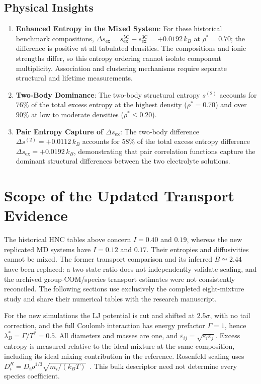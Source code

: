 \documentclass[11pt,a4paper]{article}
\begin{document}
\subsection{Physical Insights}
\begin{enumerate}
    \item \textbf{Enhanced Entropy in the Mixed System}: For these historical benchmark compositions, $\Delta s_{\text{ex}} = s_{\text{ex}}^{\text{5C}} - s_{\text{ex}}^{\text{3C}} = +0.0192 \, k_B$ at $\rho^*=0.70$; the difference is positive at all tabulated densities. The compositions and ionic strengths differ, so this entropy ordering cannot isolate component multiplicity. Association and clustering mechanisms require separate structural and lifetime measurements.
    \item \textbf{Two-Body Dominance}: The two-body structural entropy $s^{(2)}$ accounts for $76\%$ of the total excess entropy at the highest density ($\rho^* = 0.70$) and over $90\%$ at low to moderate densities ($\rho^* \le 0.20$).
    \item \textbf{Pair Entropy Capture of $\Delta s_{\text{ex}}$}: The two-body difference $\Delta s^{(2)} = +0.0112 \, k_B$ accounts for $58\%$ of the total excess entropy difference $\Delta s_{\text{ex}} = +0.0192 \, k_B$, demonstrating that pair correlation functions capture the dominant structural differences between the two electrolyte solutions.
\end{enumerate}


\section{Scope of the Updated Transport Evidence}

The historical HNC tables above concern $I=0.40$ and $0.19$, whereas the new replicated MD systems have $I=0.12$ and $0.17$. Their entropies and diffusivities cannot be mixed. The former transport comparison and its inferred $B\simeq2.44$ have been replaced: a two-state ratio does not independently validate scaling, and the archived group-COM/species transport estimates were not consistently reconciled. The following sections use exclusively the completed eight-mixture study and share their numerical tables with the research manuscript.

For the new simulations the LJ potential is cut and shifted at $2.5\sigma$, with no tail correction, and the full Coulomb interaction has energy prefactor $\Gamma=1$, hence $\lambda_B^*=\Gamma/T^*=0.5$. All diameters and masses are one, and $\varepsilon_{ij}=\sqrt{\varepsilon_i\varepsilon_j}$. Excess entropy is measured relative to the ideal mixture at the same composition, including its ideal mixing contribution in the reference. Rosenfeld scaling uses $D_i^R=D_i\rho^{1/3}\sqrt{m_i/(k_BT)}$~\cite{Rosenfeld1977,Rosenfeld1999}. This bulk descriptor need not determine every species coefficient.
\end{document}
